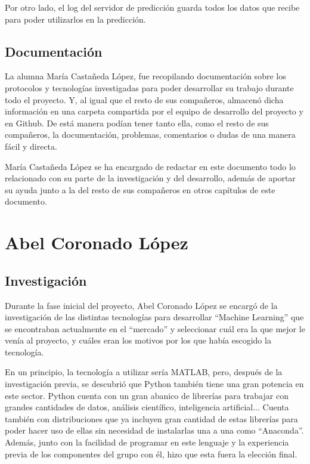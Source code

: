 Por otro lado, el log del servidor de predicción guarda todos los datos que recibe para poder utilizarlos en la predicción.

\subsection{Documentación}

La alumna María Castañeda López, fue recopilando documentación sobre los protocolos y tecnologías investigadas para poder desarrollar su trabajo durante todo el proyecto. Y, al igual que el resto de sus compañeros, almacenó dicha información en una carpeta compartida por el equipo de desarrollo del proyecto y en Github. De está manera podían tener tanto ella, como el resto de sus compañeros, la documentación, problemas, comentarios o dudas de una manera fácil y directa.

María Castañeda López se ha encargado de redactar en este documento todo lo relacionado con su parte de la investigación y del desarrollo, además de aportar su ayuda junto a la del resto de sus compañeros en otros capítulos de este documento.

\section{Abel Coronado López}
\subsection{Investigación}

Durante la fase inicial del proyecto, Abel Coronado López se encargó de la investigación de las distintas tecnologías para desarrollar ``Machine Learning'' que se encontraban actualmente en el ``mercado'' y seleccionar cuál era la que mejor le venía al proyecto, y cuáles eran los motivos por los que había escogido la tecnología.

En un principio, la tecnología a utilizar sería MATLAB, pero, después de la investigación previa, se descubrió que Python también tiene una gran potencia en este sector. Python cuenta con un gran abanico de librerías para trabajar con grandes cantidades de datos, análisis científico, inteligencia artificial... Cuenta también con distribuciones que ya incluyen gran cantidad de estas librerías para poder hacer uso de ellas sin necesidad de instalarlas una a una como ``Anaconda''. Además, junto con la facilidad de programar en este lenguaje y la experiencia previa de los componentes del grupo con él, hizo que esta fuera la elección final.

